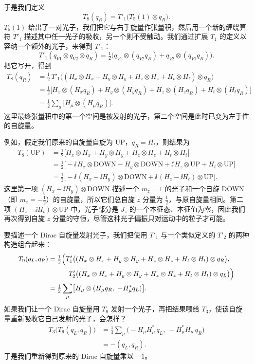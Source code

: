 于是我们定义
\begin{equation*}
T_8(q_R)=T'_1\bigl(T_5(1)\otimes q_R\bigr).
\end{equation*}
$T_5(1)$ 给出了一对光子，我们把它与右手旋量作张量积，然后用一个新的缠绕算符 $T'_1$ 描述其中任一光子的吸收，另一个则不受触动。我们通过扩展 $T_1$ 的定义以容纳一个额外的光子，来得到 $T'_1$：
\begin{equation*}
T'_1(q_{V1}\otimes q_{V2}\otimes q_R)=\tfrac12\bigl(q_{V1}\otimes(q_{V2} q_R)+q_{V2}\otimes(q_{V1} q_R)\bigr).
\end{equation*}
把它写开，得到
\begin{align*}
T_8(q_R)
&= \tfrac12\,T'_1\bigl((H_x\otimes H_x+H_y\otimes H_y+H_z\otimes H_z+H_t\otimes H_t)\otimes q_R\bigr)\\
&= \tfrac12\bigl[H_x\otimes(H_x q_R)+H_y\otimes(H_y q_R)+H_z\otimes(H_z q_R)+H_t\otimes(H_t q_R)\bigr]\\
&= \tfrac12\sum_\mu\bigl[H_\mu\otimes(H_\mu q_R)\bigr].
\end{align*}
这里最终张量积中的第一个空间是被发射的光子，第二个空间是此时已变为左手性的自旋量。

例如，假定我们原来的自旋量自旋为 UP，$q_R=H_t$，则结果为
\begin{align*}
T_8(\text{UP})
&= \tfrac12\bigl[H_x\otimes H_x+H_y\otimes H_y+H_z\otimes H_z+H_t\otimes H_t\bigr]\\
&= \tfrac12\bigl[-\ii\,H_x\otimes\text{DOWN}-H_y\otimes\text{DOWN}+\ii\,H_z\otimes\text{UP}+H_t\otimes\text{UP}\bigr]\\
&= \tfrac12\bigl[-\ii\,(H_x-\ii H_y)\otimes\text{DOWN}+\ii\,(H_z-\ii H_t)\otimes\text{UP}\bigr].
\end{align*}
这里第一项 $(H_x-\ii H_y)\otimes\text{DOWN}$ 描述一个 $m_z=1$ 的光子和一个自旋 DOWN（即 $m_z=-\tfrac12$）的自旋量，所以它们总自旋 $z$ 分量为 $\tfrac12$，与原自旋量相同。第二项 $(H_z-\ii H_t)\otimes\text{UP}$ 中，光子部分是 $J_z$ 的一个本征态、本征值为零，因此我们再次得到自旋 $z$ 分量的守恒，尽管这种光子偏振只对运动中的粒子才可能。

要描述一个 Dirac 自旋量发射光子，我们把使用 $T'_1$ 与一个类似定义的 $T'_2$ 的两种构造组合起来：
\begin{align*}
T_9(q_L,q_R)
&= \tfrac12\Bigl(T'_1\bigl((H_x\otimes H_x+H_y\otimes H_y+H_z\otimes H_z+H_t\otimes H_t)\otimes q_R\bigr),\\
&\qquad\quad T'_2\bigl((H_x\otimes H_x+H_y\otimes H_y+H_z\otimes H_z+H_t\otimes H_t)\otimes q_L\bigr)\Bigr)\\
&= \tfrac12\sum_\mu\bigl[H_\mu\otimes(H_\mu q_R,\ -H_\mu^* q_L)\bigr].
\end{align*}
如果我们让一个 Dirac 自旋量用 $T_9$ 发射一个光子，再把结果喂给 $T_3$，使该自旋量重新吸收它自己发射的光子，会怎样？
\begin{align*}
T_3\bigl(T_9(q_L,q_R)\bigr)
&= \tfrac14\sum_\mu\bigl(-H_\mu H_\mu^*\,q_L,\ -H_\mu^* H_\mu\,q_R\bigr)\\
&= -(q_L,q_R).
\end{align*}
于是我们重新得到原来的 Dirac 自旋量乘以 $-1$。


